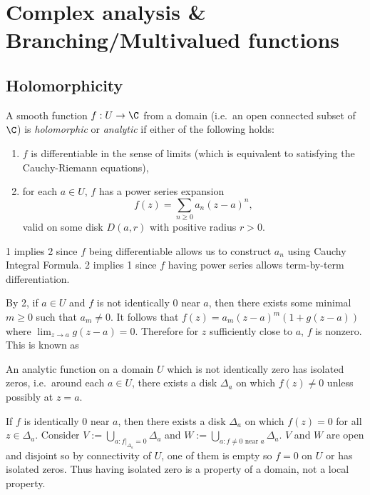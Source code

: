 \documentclass[a4paper]{article}
\begin{document}


\tableofcontents

\section{Complex analysis \& Branching/Multivalued functions}

\subsection{Holomorphicity}

\begin{definition}
  A smooth function \(f: U \to \C\) from a domain (i.e.\ an open connected subset of \(\C\)) is \emph{holomorphic} or \emph{analytic} if either of the following holds:
  \begin{enumerate}
  \item \(f\) is differentiable in the sense of limits (which is equivalent to satisfying the Cauchy-Riemann equations),
  \item for each \(a \in U\), \(f\) has a power series expansion
    \[
      f(z) = \sum_{n \geq 0} a_n (z - a)^n,
    \]
    valid on some disk \(D(a, r)\) with positive radius \(r > 0\).
  \end{enumerate}
\end{definition}

\begin{remark}
  1 implies 2 since \(f\) being differentiable allows us to construct \(a_n\) using Cauchy Integral Formula. 2 implies 1 since \(f\) having power series allows term-by-term differentiation.
\end{remark}

By 2, if \(a \in U\) and \(f\) is not identically \(0\) near \(a\), then there exists some minimal \(m \geq 0\) such that \(a_m \neq 0\). It follows that \(f(z) = a_m (z - a)^m (1 + g(z - a))\) where \(\lim_{z \to a} g(z - a) = 0\). Therefore for \(z\) sufficiently close to \(a\), \(f\) is nonzero. This is known as

\begin{theorem}
  An analytic function on a domain \(U\) which is not identically zero has isolated zeros, i.e.\ around each \(a \in U\), there exists a disk \(\Delta_a\) on which \(f(z) \neq 0\) unless possibly at \(z = a\).
\end{theorem}

If \(f\) is identically \(0\) near \(a\), then there exists a disk \(\Delta_a\) on which \(f(z) = 0\) for all \(z \in \Delta_a\). Consider \(V := \bigcup_{a: f|_{\Delta_a} = 0} \Delta_a\) and \(W := \bigcup_{a: f \neq 0 \text{ near } a} \Delta_a\). \(V\) and \(W\) are open and disjoint so by connectivity of \(U\), one of them is empty so \(f = 0\) on \(U\) or has isolated zeros. Thus having isolated zero is a property of a domain, not a local property.
\end{document}
